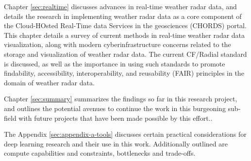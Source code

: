 Chapter \ref{sec:realtime} discusses advances in real-time weather radar data, and details the research in implementing weather radar data as a core component of the Cloud-HOsted Real-Time data Services in the geosciences (CHORDS) portal.
This chapter details a survey of current methods in real-time weather radar data visualization, along with modern cyberinfrastructure concerns related to the storage and visualization of weather radar data.
The current CF/Radial standard is discussed, as well as the importance in using such standards to promote findability, accessibility, interoperability, and reusability (FAIR) principles in the domain of weather radar data.

Chapter \ref{sec:summary} summarizes the findings so far in this research project, and outlines the potential avenues to continue the work in this burgeoning sub-field with future projects that have been made possible by this effort..

The Appendix \ref{sec:appendix-a-tools} discusses certain practical considerations for deep learning research and their use in this work.
Additionally outlined are compute capabilities and constraints, bottlenecks and trade-offs.